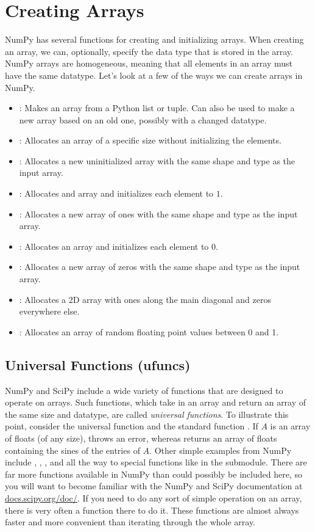 \section*{Creating Arrays}
NumPy has several functions for creating and initializing arrays.
When creating an array, we can, optionally, specify the data type that is stored in the 
array.
NumPy arrays are homogeneous, meaning that all elements in an array must have the same 
datatype.
Let's look at a few of the ways we can create arrays in NumPy.
\begin{itemize}
\item {}: Makes an array from a Python list or tuple.
Can also be used to make a new array based on an old one, possibly with a changed datatype.
\item {}: Allocates an array of a specific size without initializing the elements.
\item {}: Allocates a new uninitialized array with the same shape and type as the input array.
\item {}: Allocates and array and initializes each element to $1$.
\item {}: Allocates a new array of ones with the same shape and type as the input array.
\item {}: Allocates an array and initializes each element to $0$.
\item {}: Allocates a new array of zeros with the same shape and type as the input array.
\item {}: Allocates a 2D array with ones along the main diagonal and zeros everywhere else.
\item {}: Allocates an array of random floating point values between 0 and 1.
\end{itemize}

\subsection*{Universal Functions (ufuncs)}
NumPy and SciPy include a wide variety of functions that are designed to operate on 
arrays.
Such functions, which take in an array and return an array of the same size and
datatype, are called \emph{universal functions}. To illustrate this point, consider 
the universal function  and the standard function . If $A$ 
is an array of floats (of any size),  throws an error, whereas 
 returns an array of floats containing the sines of the entries of $A$. 
Other simple examples from NumPy include , , , and 
 all the way to special functions like  in the  submodule.
There are far more functions available in NumPy than could possibly be included here, so you will want to become familiar with the NumPy and SciPy documentation at \url{docs.scipy.org/doc/}.
If you need to do any sort of simple operation on an array, there is very often a function there to do it.
These functions are almost always faster and more convenient than iterating through the whole array.

